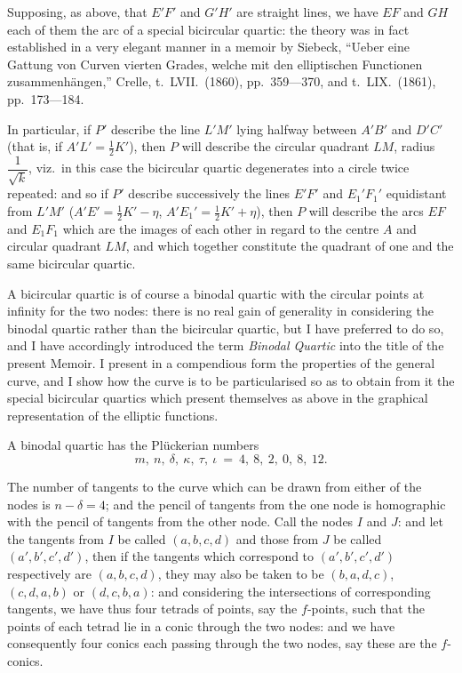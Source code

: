 \documentclass[11pt,a4paper]{article}
\begin{document}
Supposing, as above, that $E'F'$ and $G'H'$ are straight lines, we have $EF$ and $GH$ each of them the arc of a special bicircular quartic: the theory was in fact established in a very elegant manner in a memoir by Siebeck, ``Ueber eine Gattung von Curven vierten Grades, welche mit den elliptischen Functionen zusammenh\"angen,'' Crelle, t.\ LVII.\ (1860), pp.\ 359---370, and t.\ LIX.\ (1861), pp.\ 173---184.

In particular, if $P'$ describe the line $L'M'$ lying halfway between $A'B'$ and $D'C'$ (that is, if $A'L' = \tfrac{1}{2}K'$), then $P$ will describe the circular quadrant $LM$, radius $\dfrac{1}{\sqrt{k}}$, viz.\ in this case the bicircular quartic degenerates into a circle twice repeated: and so if $P'$ describe successively the lines $E'F'$ and $E_1'F_1'$ equidistant from $L'M'$ ($A'E' = \tfrac{1}{2}K' - \eta$, $A'E_1' = \tfrac{1}{2}K' + \eta$), then $P$ will describe the arcs $EF$ and $E_1F_1$ which are the images of each other in regard to the centre $A$ and circular quadrant $LM$, and which together constitute the quadrant of one and the same bicircular quartic.

A bicircular quartic is of course a binodal quartic with the circular points at infinity for the two nodes: there is no real gain of generality in considering the binodal quartic rather than the bicircular quartic, but I have preferred to do so, and I have accordingly introduced the term \emph{Binodal Quartic} into the title of the present Memoir. I present in a compendious form the properties of the general curve, and I show how the curve is to be particularised so as to obtain from it the special bicircular quartics which present themselves as above in the graphical representation of the elliptic functions.

A binodal quartic has the Pl\"uckerian numbers
\[
m,\ n,\ \delta,\ \kappa,\ \tau,\ \iota\ =\ 4,\ 8,\ 2,\ 0,\ 8,\ 12.
\]

The number of tangents to the curve which can be drawn from either of the nodes is $n - \delta = 4$; and the pencil of tangents from the one node is homographic with the pencil of tangents from the other node. Call the nodes $I$ and $J$: and let the tangents from $I$ be called $(a, b, c, d)$ and those from $J$ be called $(a', b', c', d')$, then if the tangents which correspond to $(a', b', c', d')$ respectively are $(a, b, c, d)$, they may also be taken to be $(b, a, d, c)$, $(c, d, a, b)$ or $(d, c, b, a)$: and considering the intersections of corresponding tangents, we have thus four tetrads of points, say the $f$-points, such that the points of each tetrad lie in a conic through the two nodes: and we have consequently four conics each passing through the two nodes, say these are the $f$-conics.
\end{document}
